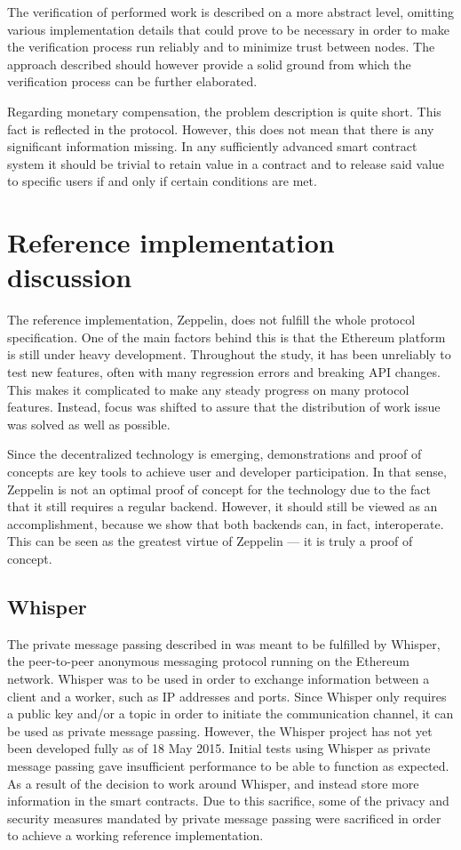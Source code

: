 The verification of performed work is described on a more abstract level, omitting various implementation details that could prove to be necessary in order to make the verification process run reliably and to minimize trust between nodes. The approach described should however provide a solid ground from which the verification process can be further elaborated.

Regarding monetary compensation, the problem description is quite short. This fact is reflected in the protocol. However, this does not mean that there is any significant information missing. In any sufficiently advanced smart contract system it should be trivial to retain value in a contract and to release said value to specific users if and only if certain conditions are met.

\section{Reference implementation discussion}
The reference implementation, Zeppelin, does not fulfill the whole protocol specification. One of the main factors behind this is that the Ethereum platform is still under heavy development. Throughout the study, it has been unreliably to test new features, often with many regression errors and breaking API changes. This makes it complicated to make any steady progress on many protocol features. Instead, focus was shifted to assure that the distribution of work issue was solved as well as possible.

Since the decentralized technology is emerging, demonstrations and proof of concepts are key tools to achieve user and developer participation. In that sense, Zeppelin is not an optimal proof of concept for the technology due to the fact that it still requires a regular backend. However, it should still be viewed as an accomplishment, because we show that both backends can, in fact, interoperate. This can be seen as the greatest virtue of Zeppelin --- it is truly a proof of concept.

\subsection{Whisper}
The private message passing described in  was meant to be fulfilled by Whisper, the peer-to-peer anonymous messaging protocol running on the Ethereum network. Whisper was to be used in order to exchange information between a client and a worker, such as IP addresses and ports. Since Whisper only requires a public key and/or a topic in order to initiate the communication channel, it can be used as private message passing. However, the Whisper project has not yet been developed fully as of 18 May 2015. Initial tests using Whisper as private message passing gave insufficient performance to be able to function as expected. As a result of the decision to work around Whisper, and instead store more information in the smart contracts. Due to this sacrifice, some of the privacy and security measures mandated by private message passing were sacrificed in order to achieve a working reference implementation.

